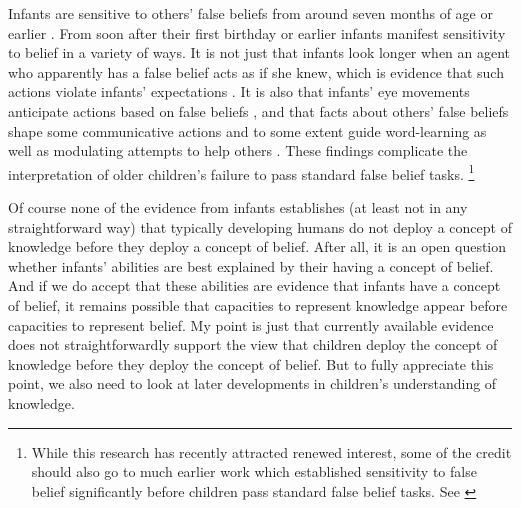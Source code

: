 \documentclass[12pt,\papersize]{extarticle}
\begin{document}
Infants are sensitive to others' false beliefs from around seven months of age or earlier \citep{kovacs_social_2010}.
From soon after their first birthday or earlier infants manifest sensitivity to belief in a variety of ways.
It is not just that infants look longer when an agent who apparently has a false belief acts as if she knew, which is evidence that such actions violate infants' expectations  \citep{Onishi:2005hm,Surian:2007hl}.
It is also that infants' eye movements anticipate actions based on false beliefs \citep{Southgate:2007js},
and that facts about others' false beliefs shape some communicative actions \citep{Knudsen:2011fk} and to some extent guide word-learning \citep{Carpenter:2002gc} as well as modulating attempts to help others \citep{Buttelmann:2009gy}.
These findings complicate the interpretation of older children's failure to pass standard false belief tasks.%
\footnote{
While this research has recently attracted renewed interest, some of the credit should also go to much earlier work which established sensitivity to false belief significantly before children pass standard false belief tasks. 
See \citet{Clements:1994cw,Garnham:2001jm,Garnham:2001ql,Ruffman:2001ng}
}



Of course none of the evidence from infants
 establishes (at least not in any straightforward way) that typically developing humans do not deploy a concept of knowledge before they deploy a concept of belief.
After all, it is an open question whether infants' abilities are best explained by their having a concept of belief.
And if we do accept that these abilities are evidence that infants have a concept of belief, 
it remains possible that capacities to represent knowledge appear before capacities to represent belief.
My point is just that currently available evidence does not straightforwardly support the view that children deploy the concept of knowledge before they deploy the concept of belief.
But to fully appreciate this point, we also need to look at later developments in children's understanding of knowledge.
\end{document}
